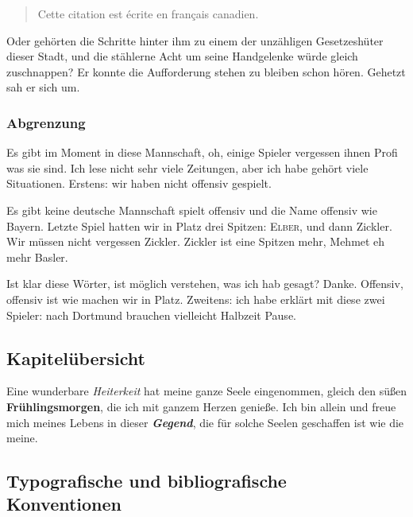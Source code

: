 \begin{french}

\begin{quote}
Cette citation est écrite en français canadien.
\end{quote}

\end{french}

Oder gehörten die Schritte hinter ihm zu einem der unzähligen
Gesetzeshüter dieser Stadt, und die stählerne Acht um seine
Handgelenke würde gleich zuschnappen? Er konnte die Aufforderung
stehen zu bleiben schon hören. Gehetzt sah er sich um.

\hypertarget{abgrenzung}{%
\subsubsection{Abgrenzung}\label{abgrenzung}}

Es gibt im Moment in diese Mannschaft, oh, einige Spieler vergessen
ihnen Profi was sie sind. Ich lese nicht sehr viele Zeitungen, aber
ich habe gehört viele Situationen. Erstens: wir haben nicht offensiv
gespielt.

Es gibt keine deutsche Mannschaft spielt offensiv und die Name
offensiv wie Bayern. Letzte Spiel hatten wir in Platz drei Spitzen:
\textsc{Elber},  und dann Zickler. Wir müssen
nicht vergessen Zickler. Zickler ist eine Spitzen mehr, Mehmet eh
mehr Basler.

Ist klar diese Wörter, ist möglich verstehen, was ich hab gesagt?
Danke. Offensiv, offensiv ist wie machen wir in Platz. Zweitens: ich
habe erklärt mit diese zwei Spieler: nach Dortmund brauchen
vielleicht Halbzeit Pause.

\hypertarget{kapiteluxfcbersicht}{%
\subsection{Kapitelübersicht}\label{kapiteluxfcbersicht}}

Eine wunderbare \emph{Heiterkeit} hat meine ganze Seele eingenommen,
gleich den süßen \textbf{Frühlingsmorgen}, die ich mit ganzem Herzen
genieße. Ich bin allein und freue mich meines Lebens in dieser
\emph{\textbf{Gegend}}, die für solche Seelen geschaffen ist wie die
meine.

\hypertarget{typografische-und-bibliografische-konventionen}{%
\subsection{Typografische und bibliografische
Konventionen}\label{typografische-und-bibliografische-konventionen}}

